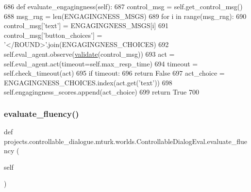 \begin{DoxyCode}
686     \textcolor{keyword}{def }evaluate\_engagingness(self):
687         control\_msg = self.get\_control\_msg()
688         msg\_rng = len(ENGAGINGNESS\_MSGS)
689         \textcolor{keywordflow}{for} i \textcolor{keywordflow}{in} range(msg\_rng):
690             control\_msg[\textcolor{stringliteral}{'text'}] = ENGAGINGNESS\_MSGS[i]
691             control\_msg[\textcolor{stringliteral}{'button\_choices'}] = \textcolor{stringliteral}{'</ROUND>'}.join(ENGAGINGNESS\_CHOICES)
692             self.eval\_agent.observe(\hyperlink{namespaceparlai_1_1core_1_1worlds_afc3fad603b7bce41dbdc9cdc04a9c794}{validate}(control\_msg))
693             act = self.eval\_agent.act(timeout=self.max\_resp\_time)
694             timeout = self.check\_timeout(act)
695             \textcolor{keywordflow}{if} timeout:
696                 \textcolor{keywordflow}{return} \textcolor{keyword}{False}
697             act\_choice = ENGAGINGNESS\_CHOICES.index(act.get(\textcolor{stringliteral}{'text'}))
698             self.engagingness\_scores.append(act\_choice)
699         \textcolor{keywordflow}{return} \textcolor{keyword}{True}
700 
\end{DoxyCode}
\mbox{\label{classprojects_1_1controllable__dialogue_1_1mturk_1_1worlds_1_1ControllableDialogEval_a538109bcc5cab0cad4e9e9bddfdadae1}} 
\subsubsection{\texorpdfstring{evaluate\+\_\+fluency()}{evaluate\_fluency()}}
{\footnotesize\ttfamily def projects.\+controllable\+\_\+dialogue.\+mturk.\+worlds.\+Controllable\+Dialog\+Eval.\+evaluate\+\_\+fluency (\begin{DoxyParamCaption}\item[{}]{self }\end{DoxyParamCaption})}



